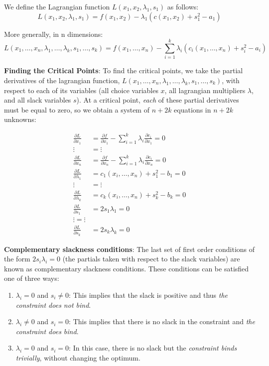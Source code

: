 \documentclass[]{book}
\providecommand{\tightlist}{%
  \setlength{\itemsep}{0pt}\setlength{\parskip}{0pt}}
\theoremstyle{definition}
\theoremstyle{definition}
\theoremstyle{definition}
\theoremstyle{remark}
\begin{document}
We define the Lagrangian function \(L(x_1,x_2,\lambda_1,s_1)\) as
follows:
\[L(x_1,x_2,\lambda_1,s_1) = f(x_1,x_2) - \lambda_1 ( c(x_1,x_2) + s_1^2 - a_1)\]

More generally, in n dimensions:
\[ L(x_1, \dots, x_n, \lambda_1, \dots, \lambda_k, s_1, \dots, s_k) = f(x_1, \dots, x_n) - \sum_{i = 1}^k \lambda_i(c_i(x_1,\dots, x_n) + s_i^2 - a_i)\]

\textbf{Finding the Critical Points}: To find the critical points, we
take the partial derivatives of the lagrangian function,
\(L(x_1,\dots,x_n,\lambda_1,\dots,\lambda_k,s_1,\dots,s_k)\), with
respect to each of its variables (all choice variables \(x\), all
lagrangian multipliers \(\lambda\), and all slack variables \(s\)). At a
critical point, \emph{each} of these partial derivatives must be equal
to zero, so we obtain a system of \(n + 2k\) equations in \(n + 2k\)
unknowns:

\begin{align*}
\frac{\partial L}{\partial x_1} &= \frac{\partial f}{\partial x_1} - \sum_{i = 1}^k\lambda_i\frac{\partial c_i}{\partial x_1} = 0\\
 \vdots & =  \vdots  \\
\frac{\partial L}{\partial x_n}  &= \frac{\partial f}{\partial x_n} - \sum_{i = 1}^k\lambda_i\frac{\partial c_i}{\partial x_n} = 0\\
\frac{\partial L}{\partial \lambda_1} &= c_1(x_i, \dots, x_n) + s_1^2 - b_1 = 0\\
 \vdots & = \vdots \\
\frac{\partial L}{\partial \lambda_k} &= c_k(x_i, \dots, x_n) + s_k^2 - b_k = 0\\
\frac{\partial L}{\partial s_1} &= 2s_1\lambda_1 = 0\\
 \vdots =\vdots \\
\frac{\partial L}{\partial s_k} &= 2s_k\lambda_k = 0
\end{align*}

\textbf{Complementary slackness conditions}: The last set of first order
conditions of the form \(2s_i\lambda_i = 0\) (the partials taken with
respect to the slack variables) are known as complementary slackness
conditions. These conditions can be satisfied one of three ways:

\begin{enumerate}
\def\labelenumi{\arabic{enumi}.}
\tightlist
\item
  \(\lambda_i = 0\) and \(s_i \neq 0\): This implies that the slack is
  positive and thus \emph{the constraint does not bind}.
\item
  \(\lambda_i \neq 0\) and \(s_i = 0\): This implies that there is no
  slack in the constraint and \emph{the constraint does bind}.
\item
  \(\lambda_i = 0\) and \(s_i = 0\): In this case, there is no slack but
  the \emph{constraint binds trivially}, without changing the optimum.
\end{enumerate}
\end{document}

